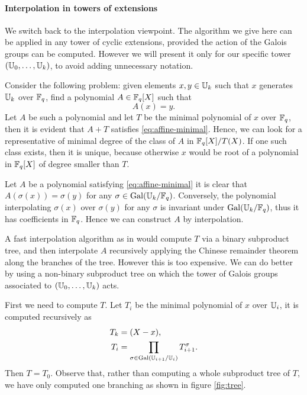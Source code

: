\paragraph{Interpolation in towers of extensions}
We switch back to the interpolation viewpoint. The algorithm we give
here can be applied in any tower of cyclic extensions, provided the
action of the Galois groups can be computed. However we will present
it only for our specific tower $(\mathbb{U}_0,\dots,\mathbb{U}_k)$, to avoid adding
unnecessary notation.

Consider the following problem: given elements $x,y\in\mathbb{U}_k$ such that
$x$ generates $\mathbb{U}_k$ over $\mathbb{F}_q$, find a polynomial $A\in\mathbb{F}_q[X]$ such
that
\begin{equation}
  \label{eq:affine-minimal}
  A(x) = y
  \text{.}
\end{equation}
Let $A$ be such a polynomial and let $T$ be the minimal polynomial of
$x$ over $\mathbb{F}_q$, then it is evident that $A+T$ satisfies
\eqref{eq:affine-minimal}. Hence, we can look for a representative of
minimal degree of the class of $A$ in $\mathbb{F}_q[X]/T(X)$. If one such
class exists, then it is unique, because otherwise $x$ would be root
of a polynomial in $\mathbb{F}_q[X]$ of degree smaller than $T$. 

Let $A$ be a polynomial satisfying \eqref{eq:affine-minimal} it is
clear that $A(\sigma(x)) = \sigma(y)$ for any
$\sigma\in\operatorname{Gal}(\mathbb{U}_k/\mathbb{F}_q)$. Conversely, the polynomial interpolating
$\sigma(x)$ over $\sigma(y)$ for any $\sigma$ is invariant under
$\operatorname{Gal}(\mathbb{U}_k/\mathbb{F}_q)$, thus it has coefficients in $\mathbb{F}_q$. Hence we can
construct $A$ by interpolation.

A fast interpolation algorithm as in \cite[10.1-2]{vzGG} would compute
$T$ via a binary subproduct tree, and then interpolate $A$ recursively
applying the Chinese remainder theorem along the branches of the
tree. However this is too expensive. We can do better by using a
non-binary subproduct tree on which the tower of Galois groups
associated to $(\mathbb{U}_0,\ldots,\mathbb{U}_k)$ acts.

First we need to compute $T$. Let $T_i$ be the minimal polynomial of
$x$ over $\mathbb{U}_i$, it is computed recursively as
\begin{align}
  T_k &= (X - x)\text{,}\\
  \label{eq:minprod}
  T_i &= \prod_{\sigma\in\operatorname{Gal}(\mathbb{U}_{i+1}/\mathbb{U}_i)}T_{i+1}^\sigma\text{.}
\end{align}
Then $T=T_0$. Observe that, rather than computing a whole subproduct
tree of $T$, we have only computed one branching as shown in figure
\ref{fig:tree}.

